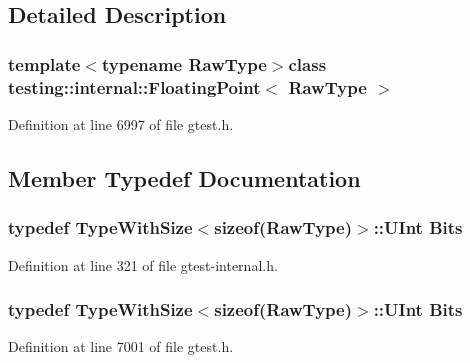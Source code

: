 \subsection{\-Detailed \-Description}
\subsubsection*{template$<$typename \-Raw\-Type$>$class testing\-::internal\-::\-Floating\-Point$<$ Raw\-Type $>$}



\-Definition at line 6997 of file gtest.\-h.



\subsection{\-Member \-Typedef \-Documentation}
\hypertarget{classtesting_1_1internal_1_1FloatingPoint_adb12c064e30491d4976393880f9dca27}{
\subsubsection[{\-Bits}]{\setlength{\rightskip}{0pt plus 5cm}typedef {\bf \-Type\-With\-Size}$<$sizeof(\-Raw\-Type)$>$\-::\-U\-Int {\bf \-Bits}}}\label{dd/d0f/classtesting_1_1internal_1_1FloatingPoint_adb12c064e30491d4976393880f9dca27}


\-Definition at line 321 of file gtest-\/internal.\-h.

\hypertarget{classtesting_1_1internal_1_1FloatingPoint_adb12c064e30491d4976393880f9dca27}{
\subsubsection[{\-Bits}]{\setlength{\rightskip}{0pt plus 5cm}typedef {\bf \-Type\-With\-Size}$<$sizeof(\-Raw\-Type)$>$\-::\-U\-Int {\bf \-Bits}}}\label{dd/d0f/classtesting_1_1internal_1_1FloatingPoint_adb12c064e30491d4976393880f9dca27}


\-Definition at line 7001 of file gtest.\-h.



